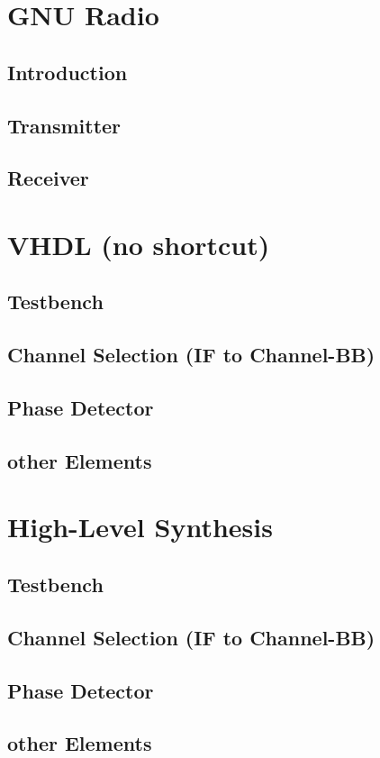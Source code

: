 \section{GNU Radio}
  \subsection{Introduction}
  \subsection{Transmitter}
  \subsection{Receiver}

\section{VHDL (no shortcut)}
  \subsection{Testbench}
  \subsection{Channel Selection (IF to Channel-BB)}
  \subsection{Phase Detector}
  \subsection{other Elements}

  \section{High-Level Synthesis}
  \subsection{Testbench}
  \subsection{Channel Selection (IF to Channel-BB)}
  \subsection{Phase Detector}
  \subsection{other Elements}

